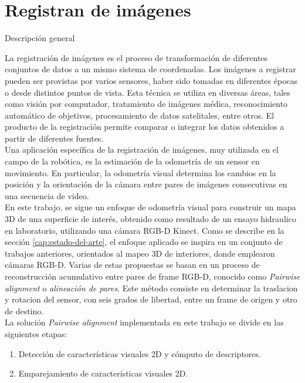 	 	 	

\chapter{Registran de imágenes}

\begin{section}{Descripción general}
\label{sec:descripcion-general-registracion}

La registración de imágenes es el proceso de transformación de diferentes conjuntos de datos a un mismo sistema de coordenadas. Los imágenes a registrar pueden ser provistas por varios sensores, haber sido tomadas en diferentes épocas o desde distintos puntos de vista. Esta técnica se utiliza en diversas áreas, tales como visión por computador, tratamiento de imágenes médica, reconocimiento automático de objetivos, procesamiento de datos satelitales, entre otros. El producto de la registración permite comparar o integrar los datos obtenidos a partir de diferentes fuentes. \\
Una aplicación específica de la registración de imágenes, muy utilizada en el campo de la robótica, es la estimación de la odometría de un sensor en movimiento. En particular, la odometría visual determina los cambios en la posición y la orientación de la cámara entre pares de imágenes consecutivas en una secuencia de video. \\
En este trabajo, se sigue un enfoque de odometría visual para construir un mapa 3D de una superficie de interés, obtenido como resultado de un ensayo hidraulico en laboratorio, utilizando una cámara RGB-D Kinect. Como se describe en la sección \ref{cap:estado-del-arte}, el enfoque aplicado se inspira en un conjunto de trabajos anteriores, orientados al mapeo 3D de interiores, donde emplearon cámaras RGB-D. Varias de estas propuestas se basan en un proceso de reconstrucción acumulativo entre pares de frame RGB-D, conocido como \textit{Pairwise alignment} o \textit{alineación de pares}. Este método consiste en determinar la traslacion y rotacion del sensor, con seis grados de libertad, entre un frame de origen y otro de destino. \\
La solución \textit{Pairwise alignment} implementada en este trabajo se divide en las siguientes etapas:
\begin{enumerate}
\item Detección de características visuales 2D y cómputo de descriptores.

\item Emparejamiento de características visuales 2D.


\end{enumerate}
\end{section}
